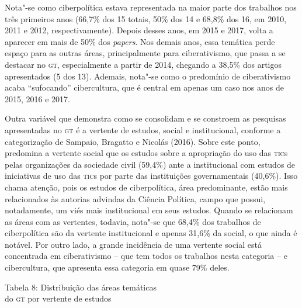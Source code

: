 Nota"-se como ciberpolítica estava representada na maior parte dos
trabalhos nos três primeiros anos (66,7\% dos 15 totais, 50\% dos 14 e
68,8\% dos 16, em 2010, 2011 e 2012, respectivamente). Depois desses
anos, em 2015 e 2017, volta a aparecer em mais de 50\% dos
\emph{papers}. Nos demais anos, essa temática perde espaço para as
outras áreas, principalmente para ciberativismo, que passa a se destacar
no \textsc{gt}, especialmente a partir de 2014, chegando a 38,5\% dos artigos
apresentados (5 dos 13). Ademais, nota"-se como o predomínio de
ciberativismo acaba ``sufocando'' cibercultura, que é central em apenas
um caso nos anos de 2015, 2016 e 2017.

Outra variável que demonstra como se consolidam e se constroem as
pesquisas apresentadas no \textsc{gt} é a vertente de estudos, social e
institucional, conforme a categorização de Sampaio, Bragatto e Nicolás
(2016). Sobre este ponto, predomina a vertente social que os estudos
sobre a apropriação do uso das \textsc{tic}s pelas organizações da sociedade
civil (59,4\%) ante a institucional com estudos de iniciativas de uso
das \textsc{tic}s por parte das instituições governamentais (40,6\%). Isso chama
atenção, pois os estudos de ciberpolítica, área predominante, estão mais
relacionados às autorias advindas da Ciência Política, campo que possui,
notadamente, um viés mais institucional em seus estudos. Quando se
relacionam as áreas com as vertentes, todavia, nota"-se que 68,4\% dos
trabalhos de ciberpolítica são da vertente institucional e apenas 31,6\%
da social, o que ainda é notável. Por outro lado, a grande incidência de
uma vertente social está concentrada em ciberativismo -- que tem todos
os trabalhos nesta categoria -- e cibercultura, que apresenta essa
categoria em quase 79\% deles.

\pagebreak

\begin{center}
Tabela 8: Distribuição das áreas temáticas\\ do \textsc{gt} por vertente de estudos
\end{center}

\noindent{}

